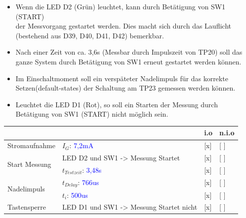 
\begin{itemize}
	\item{Wenn die LED D2 (Grün) leuchtet, kann durch Betätigung von SW1 (START)\\ der Messvorgang gestartet werden. Dies macht sich durch das Lauflicht (bestehend aus D39, D40, D41, D42) bemerkbar.}
	
	\item{Nach einer Zeit von ca. 3,6s (Messbar durch Impulszeit von TP20) soll das ganze System durch Betätigung von SW1 erneut gestartet werden können.}
	
	\item{Im Einschaltmoment soll ein verspäteter Nadelimpuls für das korrekte Setzen(default-states) der Schaltung am TP23 gemessen werden können.}
	
	 \item{Leuchtet die LED D1 (Rot), so soll ein Starten der Messung durch Betätigung von SW1 (START) nicht möglich sein.}
\end{itemize}


\renewcommand{\arraystretch}{2}
\begin{tabularx}{\textwidth}{p{}| p{} | p{} | p{}}

 &  & i.o & n.i.o \\

\hline

Stromaufnahme & $I_{G}$: \textcolor{blue}{7,2mA} 					& [x] & [ ] \\

\hline

\multirow{2}{*}{Start Messung}
		& LED D2 und SW1 -> Messung Startet		 					& [x] & [ ] \\
		& $t_{Testzeit}$:	\textcolor{blue}{3,48s}					& [x] & [ ] \\

\hline

\multirow{2}{*}{Nadelimpuls}
		& $t_{Delay}$: \textcolor{blue}{766us}						&[x] & [ ] 	\\
		& $t_{i}$: 	\textcolor{blue}{500us}							&[x] & [ ] 	\\
		
\hline

Tastensperre & LED D1 und SW1 -> Messung Startet nicht 				&[x] & [ ] \\
		
\end{tabularx}
\renewcommand{\arraystretch}{1}


